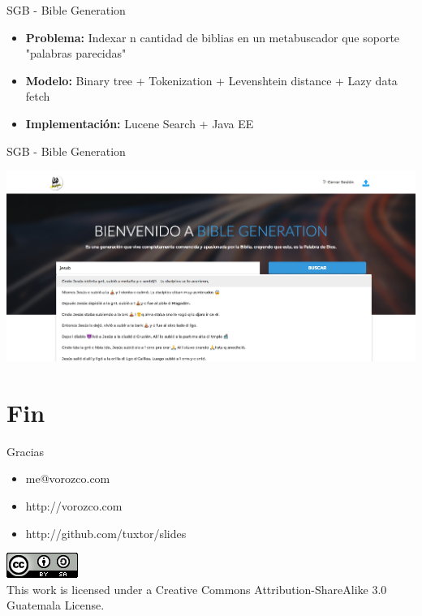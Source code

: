\documentclass{beamer}
\begin{document}
\begin{frame}{SGB - Bible Generation}
    \begin{itemize}
        \item \textbf{Problema:} Indexar n cantidad de biblias en un metabuscador que soporte "palabras parecidas"
        \item \textbf{Modelo: } Binary tree + Tokenization + Levenshtein distance + Lazy data fetch
         \item \textbf{Implementación: } Lucene Search + Java EE 
    \end{itemize}
\end{frame}

\begin{frame}{SGB - Bible Generation}
    \begin{center}
        \includegraphics[width=0.9\linewidth]{Images/bible}
    \end{center}
\end{frame}


\section{Fin}

\begin{frame}{Gracias}
\begin{itemize}
\item me@vorozco.com
\item http://vorozco.com
\item http://github.com/tuxtor/slides
\end{itemize}
\begin{center}
\includegraphics[width=0.1\linewidth]{Images/cclogo}
\\
This work is licensed under a Creative Commons Attribution-ShareAlike 3.0 Guatemala License.
\end{center}
\end{frame}
\end{document}
